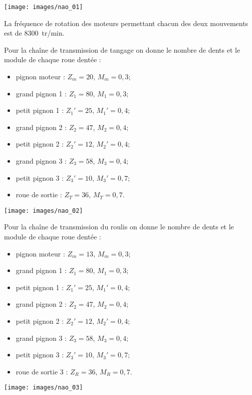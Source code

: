 \documentclass[10pt,fleqn]{article} %
\begin{document}
\begin{multicols}{2}
\begin{multicols}{2}
\begin{center}
\texttt{[image: images/nao\_01]}
\end{center}

La fréquence de rotation des moteurs permettant chacun des deux mouvements est de \SI{8300}{tr/min}.

Pour la chaîne de transmission de tangage on donne  le nombre de dents et le module de chaque roue dentée : 
\begin{itemize}
\item pignon moteur : $Z_m=20$, $M_m=0,3$;
\item grand pignon 1 : $Z_1 = 80$, $M_1=0,3$;
\item petit pignon 1 : $Z_1' = 25$, $M_1'=0,4$;
\item grand pignon 2 : $Z_2 = 47$, $M_2=0,4$;
\item petit pignon 2 : $Z_2' = 12$, $M_2'=0,4$;
\item grand pignon 3 : $Z_3 = 58$, $M_3=0,4$;
\item petit pignon 3 : $Z_3' = 10$, $M_3'=0,7$;
\item roue de sortie : $Z_T = 36$, $M_T=0,7$.
\end{itemize}

\begin{center}
\texttt{[image: images/nao\_02]}
\end{center}

Pour la chaîne de transmission du roulis on donne le nombre de dents et le module de chaque roue dentée : 
\begin{itemize}
\item pignon moteur : $Z_m=13$, $M_m=0,3$;
\item grand pignon 1 : $Z_1 = 80$, $M_1=0,3$;
\item petit pignon 1 : $Z_1' = 25$, $M_1'=0,4$;
\item grand pignon 2 : $Z_2 = 47$, $M_2=0,4$;
\item petit pignon 2 : $Z_2' = 12$, $M_2'=0,4$;
\item grand pignon 3 : $Z_3 = 58$, $M_3=0,4$;
\item petit pignon 3 : $Z_3' = 10$, $M_3'=0,7$;
\item roue de sortie 3 : $Z_R = 36$, $M_R=0,7$.
\end{itemize}



\begin{center}
\texttt{[image: images/nao\_03]}
\end{center}
\fi




\end{multicols}
\end{multicols}
\end{document}

